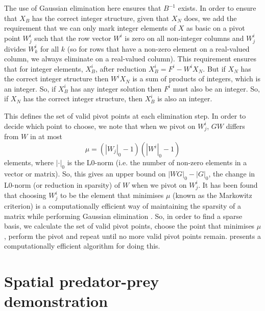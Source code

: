 \documentclass{article}
\begin{document}
The use of Gaussian elimination here ensures that $B^{-1}$ exists. In order to ensure that $X_B$ has the correct integer structure, given that $X_N$ does, we add the requirement that we can only mark integer elements of $X$ as basic on a pivot point $W^i_j$ such that the row vector $W^i$ is zero on all non-integer columns and $W^i_j$ divides $W^i_k$ for all $k$ (so for rows that have a non-zero element on a real-valued column, we always eliminate on a real-valued column). This requirement ensures that for integer elements, $X_B^i$, after reduction $X_B^i = F^i - W^iX_N$. But if $X_N$ has the correct integer structure then $W^iX_N$ is a sum of products of integers, which is an integer. So, if $X_B^i$ has any integer solution then $F^i$ must also be an integer. So, if $X_N$ has the correct integer structure, then $X_B^i$ is also an integer.

This defines the set of valid pivot points at each elimination step. In order to decide which point to choose, we note that when we pivot on $W^i_j$, $GW$ differs from $W$ in at most 
\[
\mu = (\left|W_j\right|_0-1)(\left|W^i\right|_0-1)
\]
 elements, where $\left|\cdot\right|_0$ is the L0-norm (i.e. the number of non-zero elements in a vector or matrix). So, this gives an upper bound on $\left|WG\right|_0 - \left|G\right|_0$, the change in L0-norm (or reduction in sparsity) of $W$ when we pivot on $W^i_j$. It has been found that choosing $W^i_j$ to be the element that minimises $\mu$ (known as the Markowitz criterion) is a computationally efficient way of maintaining the sparsity of a matrix while performing Gaussian elimination \citep*{markowitz1957elimination, suhl1990computing, maros2002computational}. So, in order to find a sparse basis, we calculate the set of valid pivot points, choose the point that minimises $\mu$, perform the pivot and repeat until no more valid pivot points remain. \citet{suhl1990computing} presents a computationally efficient algorithm for doing this.

\section{Spatial predator-prey demonstration}
\end{document}
